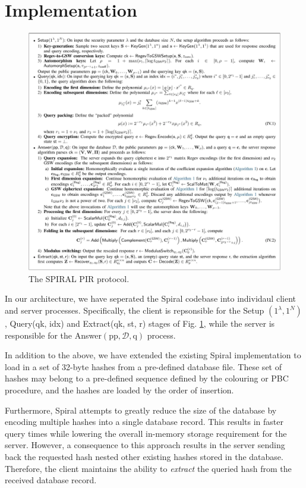 \section{Implementation}

\begin{figure}[h]
    \centering
    \includegraphics[width=\linewidth]{Images/Spiral_Protocol.png}
    \caption{The SPIRAL PIR protocol.}
    \label{fig:protocol_overview}
\end{figure}

In our architecture, we have seperated the Spiral codebase into individaul client and
server processes. Specifically, the client is repsonsible for the Setup
$\left(1^{\lambda}, 1^{N}\right)$, Query(qk, idx) and Extract(qk, st, r) stages of Fig.
\ref{fig:protocol_overview}, while the server is responsible for the Answer$(\mathrm{pp},
\mathcal{D}, \mathrm{q})$ process.

In addition to the above, we have extended the existing Spiral implementation to load in
a set of 32-byte hashes from a pre-defined database file. These set of hashes
may belong to a pre-defined sequence defined by the colouring or PBC procedure, and the hashes
are loaded by the order of insertion.

Furthermore, Spiral attempts to greatly reduce the size of the database by encoding
multiple hashes into a single database record. This results in faster query times while
lowering the overall in-memory storage requirement for the server. However, a consequence
to this approach results in the server sending back the requested hash nested other
existing hashes stored in the database. Therefore, the client maintains the ability to
\textit{extract} the queried hash from the received database record.

